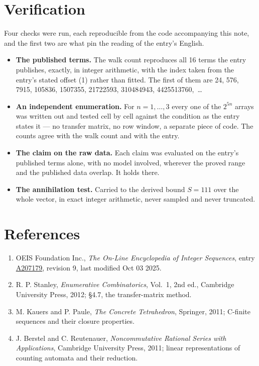 \documentclass[11pt]{article}
\theoremstyle{definition}
\begin{document}
\section{Verification}

Four checks were run, each reproducible from the code accompanying this note, and the first two are what pin the reading of the entry's English.

\begin{itemize}

\item {\bfseries The published terms.} The walk count reproduces all 16 terms the entry publishes, exactly, in integer arithmetic, with the index taken from the entry's stated offset (1) rather than fitted. The first of them are 24, 576, 7915, 105836, 1507355, 21722593, 310484943, 4425513760,~\dots

\item {\bfseries An independent enumeration.} For $n = 1,\dots,3$ every one of the $2^{5n}$ arrays was written out and tested cell by cell against the condition as the entry states it --- no transfer matrix, no row window, a separate piece of code. The counts agree with the walk count and with the entry.

\item {\bfseries The claim on the raw data.} Each claim was evaluated on the entry's published terms alone, with no model involved, wherever the proved range and the published data overlap. It holds there.

\item {\bfseries The annihilation test.} Carried to the derived bound $S = 111$ over the whole vector, in exact integer arithmetic, never sampled and never truncated.

\end{itemize}

\section{References}

\begin{enumerate}

\item OEIS Foundation Inc., \emph{The On-Line Encyclopedia of Integer Sequences}, entry \href{https://oeis.org/A207179}{A207179}, revision 9, last modified Oct 03 2025.

\item R. P. Stanley, \emph{Enumerative Combinatorics}, Vol.~1, 2nd ed., Cambridge University Press, 2012; \S4.7, the transfer-matrix method.

\item M. Kauers and P. Paule, \emph{The Concrete Tetrahedron}, Springer, 2011; C-finite sequences and their closure properties.

\item J. Berstel and C. Reutenauer, \emph{Noncommutative Rational Series with Applications}, Cambridge University Press, 2011; linear representations of counting automata and their reduction.

\end{enumerate}
\end{document}
